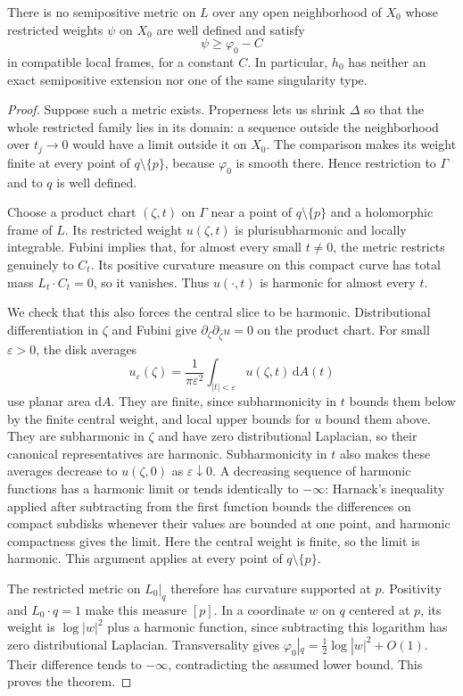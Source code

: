 \begin{theorem}\label{thm:four-point-semipositive-metric-nonextension}
There is no semipositive metric on $L$ over any open neighborhood of $X_0$ whose restricted weights $\psi$ on $X_0$ are well defined and satisfy
\[
 \psi\geq\varphi_0-C
\]
in compatible local frames, for a constant $C$. In particular, $h_0$ has neither an exact semipositive extension nor one of the same singularity type.
\end{theorem}
\begin{proof}
Suppose such a metric exists. Properness lets us shrink $\Delta$ so that the whole restricted family lies in its domain: a sequence outside the neighborhood over $t_j\to0$ would have a limit outside it on $X_0$. The comparison makes its weight finite at every point of $q\setminus\{p\}$, because $\varphi_0$ is smooth there. Hence restriction to $\Gamma$ and to $q$ is well defined.

Choose a product chart $(\zeta,t)$ on $\Gamma$ near a point of $q\setminus\{p\}$ and a holomorphic frame of $L$. Its restricted weight $u(\zeta,t)$ is plurisubharmonic and locally integrable. Fubini implies that, for almost every small $t\ne0$, the metric restricts genuinely to $C_t$. Its positive curvature measure on this compact curve has total mass $L_t\cdot C_t=0$, so it vanishes. Thus $u(\cdot,t)$ is harmonic for almost every $t$.

We check that this also forces the central slice to be harmonic. Distributional differentiation in $\zeta$ and Fubini give $\partial_\zeta\partial_{\bar\zeta}u=0$ on the product chart. For small $\varepsilon>0$, the disk averages
\[
 u_\varepsilon(\zeta)=\frac1{\pi\varepsilon^2}
       \int_{|t|<\varepsilon}u(\zeta,t)\,\mathrm{d}A(t)
\]
use planar area $\mathrm{d}A$. They are finite, since subharmonicity in $t$ bounds them below by the finite central weight, and local upper bounds for $u$ bound them above. They are subharmonic in $\zeta$ and have zero distributional Laplacian, so their canonical representatives are harmonic. Subharmonicity in $t$ also makes these averages decrease to $u(\zeta,0)$ as $\varepsilon\downarrow0$. A decreasing sequence of harmonic functions has a harmonic limit or tends identically to $-\infty$: Harnack's inequality applied after subtracting from the first function bounds the differences on compact subdisks whenever their values are bounded at one point, and harmonic compactness gives the limit. Here the central weight is finite, so the limit is harmonic. This argument applies at every point of $q\setminus\{p\}$.

The restricted metric on $L_0|_q$ therefore has curvature supported at $p$. Positivity and $L_0\cdot q=1$ make this measure $[p]$. In a coordinate $w$ on $q$ centered at $p$, its weight is $\log|w|^2$ plus a harmonic function, since subtracting this logarithm has zero distributional Laplacian. Transversality gives $\varphi_0|_q=\tfrac12\log|w|^2+O(1)$. Their difference tends to $-\infty$, contradicting the assumed lower bound. This proves the theorem.
\end{proof}
